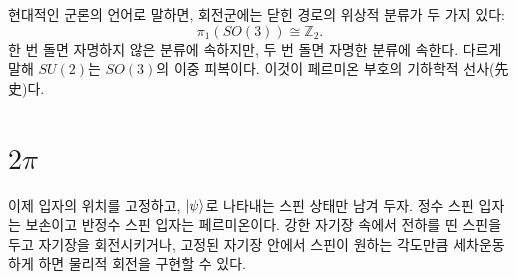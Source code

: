 \begin{classroomqa}\end{classroomqa}

현대적인 군론의 언어로 말하면, 회전군에는 닫힌 경로의 위상적 분류가 두 가지 있다:
\begin{equation}
\pi_1\!\left(SO(3)\right)\cong \mathbb Z_2.
\end{equation}
한 번 돌면 자명하지 않은 분류에 속하지만, 두 번 돌면 자명한 분류에 속한다.
다르게 말해 \(SU(2)\)는 \(SO(3)\)의 이중 피복이다. 이것이 페르미온 부호의 기하학적
선사(先史)다.


\section{\texorpdfstring{\(2\pi\)}{ 회전이 양자 상태에 하는 일2}}

이제 입자의 위치를 고정하고, \(\left\lvert\psi\right\rangle\)로 나타내는 스핀 상태만 남겨 두자. 정수 스핀 입자는 보손이고 반정수 스핀 입자는 페르미온이다. 강한 자기장 속에서 전하를 띤 스핀을 두고 자기장을 회전시키거나, 고정된 자기장 안에서 스핀이 원하는 각도만큼 세차운동하게 하면 물리적 회전을 구현할 수 있다.

\begin{classroomqa}\end{classroomqa}

